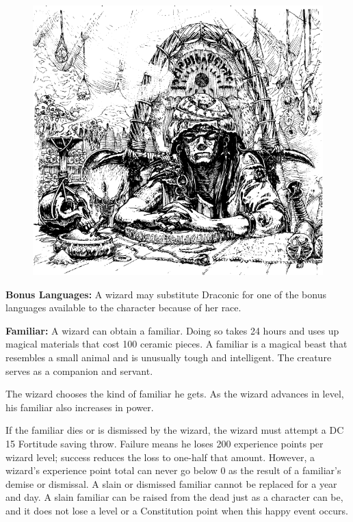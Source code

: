 \begin{figure}[b!]
\centering
\includegraphics[width=\textwidth-2cm]{images/wizard-5.png}
\WOTC
\end{figure}

\textbf{Bonus Languages:} A wizard may substitute Draconic for one of the bonus languages available to the character because of her race.

\textbf{Familiar:} A wizard can obtain a familiar. Doing so takes 24 hours and uses up magical materials that cost 100 ceramic pieces. A familiar is a magical beast that resembles a small animal and is unusually tough and intelligent. The creature serves as a companion and servant.

The wizard chooses the kind of familiar he gets. As the wizard advances in level, his familiar also increases in power.

If the familiar dies or is dismissed by the wizard, the wizard must attempt a DC 15 Fortitude saving throw. Failure means he loses 200 experience points per wizard level; success reduces the loss to one-half that amount. However, a wizard's experience point total can never go below 0 as the result of a familiar's demise or dismissal. A slain or dismissed familiar cannot be replaced for a year and day. A slain familiar can be raised from the dead just as a character can be, and it does not lose a level or a Constitution point when this happy event occurs.

